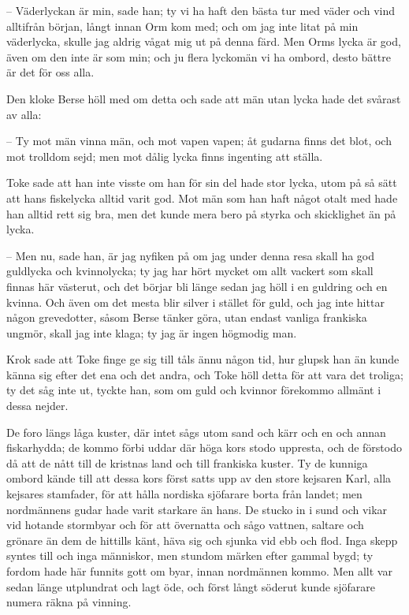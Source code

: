 – Väderlyckan är min, sade han; ty vi ha haft den bästa tur med väder och vind alltifrån början, långt innan Orm kom med; och om jag inte litat på min väderlycka, skulle jag aldrig vågat mig ut på denna färd. Men Orms lycka är god, även om den inte är som min; och ju flera lyckomän vi ha ombord, desto bättre är det för oss alla.

\initial Den kloke Berse höll med om detta och sade att män utan lycka hade det svårast av alla:

– Ty mot män vinna män, och mot vapen vapen; åt gudarna finns det blot, och mot trolldom sejd; men mot dålig lycka finns ingenting att ställa.

\initial Toke sade att han inte visste om han för sin del hade stor lycka, utom på så sätt att hans fiskelycka alltid varit god. Mot män som han haft något otalt med hade han alltid rett sig bra, men det kunde mera bero på styrka och skicklighet än på lycka.

– Men nu, sade han, är jag nyfiken på om jag under denna resa skall ha god guldlycka och kvinnolycka; ty jag har hört mycket om allt vackert som skall finnas här västerut, och det börjar bli länge sedan jag höll i en guldring och en kvinna. Och även om det mesta blir silver i stället för guld, och jag inte hittar någon grevedotter, såsom Berse tänker göra, utan endast vanliga frankiska ungmör, skall jag inte klaga; ty jag är ingen högmodig man.

\initial Krok sade att Toke finge ge sig till tåls ännu någon tid, hur glupsk han än kunde känna sig efter det ena och det andra, och Toke höll detta för att vara det troliga; ty det såg inte ut, tyckte han, som om guld och kvinnor förekommo allmänt i dessa nejder.

\initial De foro längs låga kuster, där intet sågs utom sand och kärr och en och annan fiskarhydda; de kommo förbi uddar där höga kors stodo uppresta, och de förstodo då att de nått till de kristnas land och till frankiska kuster. Ty de kunniga ombord kände till att dessa kors först satts upp av den store kejsaren Karl, alla kejsares stamfader, för att hålla nordiska sjöfarare borta från landet; men nordmännens gudar hade varit starkare än hans. De stucko in i sund och vikar vid hotande stormbyar och för att övernatta och sågo vattnen, saltare och grönare än dem de hittills känt, häva sig och sjunka vid ebb och flod. Inga skepp syntes till och inga människor, men stundom märken efter gammal bygd; ty fordom hade här funnits gott om byar, innan nordmännen kommo. Men allt var sedan länge utplundrat och lagt öde, och först långt söderut kunde sjöfarare numera räkna på vinning.

